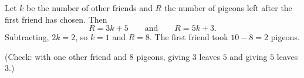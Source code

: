 Let $k$ be the number of other friends and $R$ the number of pigeons left after the first friend has chosen. Then
\[R=3k+5\qquad\text{and}\qquad R=5k+3 .\]
Subtracting, $2k=2$, so $k=1$ and $R=8$. The first friend took $10-8=\boxed{2}$ pigeons.

(Check: with one other friend and $8$ pigeons, giving $3$ leaves $5$ and giving $5$ leaves $3$.)
